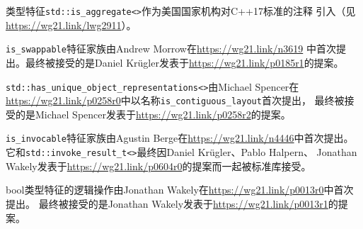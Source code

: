 类型特征\texttt{std::is\_aggregate<>}作为美国国家机构对C++17标准的注释
引入（见\url{https://wg21.link/lwg2911}）。

\texttt{is\_swappable}特征家族由Andrew Morrow在\url{https://wg21.link/n3619}
中首次提出。最终被接受的是Daniel Krügler发表于\url{https://wg21.link/p0185r1}的提案。

\texttt{std::has\_unique\_object\_representations<>}由Michael Spencer在\\
\url{https://wg21.link/p0258r0}中以名称\texttt{is\_contiguous\_layout}首次提出，
最终被接受的是Michael Spencer发表于\url{https://wg21.link/p0258r2}的提案。

\texttt{is\_invocable}特征家族由Agustin Berge在\url{https://wg21.link/n4446}中首次提出。\\
它和\texttt{std::invoke\_result\_t<>}最终因Daniel Krügler、Pablo Halpern、
Jonathan Wakely发表于\url{https://wg21.link/p0604r0}的提案而一起被标准库接受。

bool类型特征的逻辑操作由Jonathan Wakely在\url{https://wg21.link/p0013r0}中首次提出。
最终被接受的是Jonathan Wakely发表于\url{https://wg21.link/p0013r1}的提案。